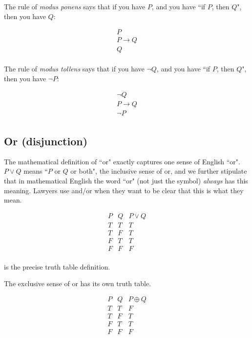 \documentclass[12pt]{article}
\begin{document}
The rule of {\em modus ponens\/} says that if you have $P$, and you have ``if $P$, then $Q$", then you have $Q$:

$$\begin{array}{c}

P \\

P \rightarrow Q \\ \hline

Q \\
\end{array}$$

The rule of {\em modus tollens\/} says that if you have $\neg Q$, and you have ``if $P$, then $Q$", then you have $\neg P$:

$$\begin{array}{c}

\neg Q \\

P \rightarrow Q \\ \hline

\neg P \\
\end{array}$$

\subsection{Or (disjunction)}

The mathematical definition of ``or" exactly captures one sense of English ``or".  $P \vee Q$ means ``$P$ or $Q$ or both", the inclusive sense of or, and we further stipulate that in mathematical English the word ``or" (not just the symbol) {\em always\/} has this meaning.  Lawyers use and/or when they want to be clear that this is what they mean.


$$\begin{array}{cc|c}
P & Q & P \vee Q \\ \hline
T & T & T \\
T & F & T \\
F & T & T \\
F & F & F \\
\end{array}$$

is the precise truth table definition.

The exclusive sense of or has its own truth table.

$$\begin{array}{cc|c}
P & Q & P \oplus Q \\ \hline
T & T & F \\
T & F & T \\
F & T & T \\
F & F & F \\
\end{array}$$
\end{document}
